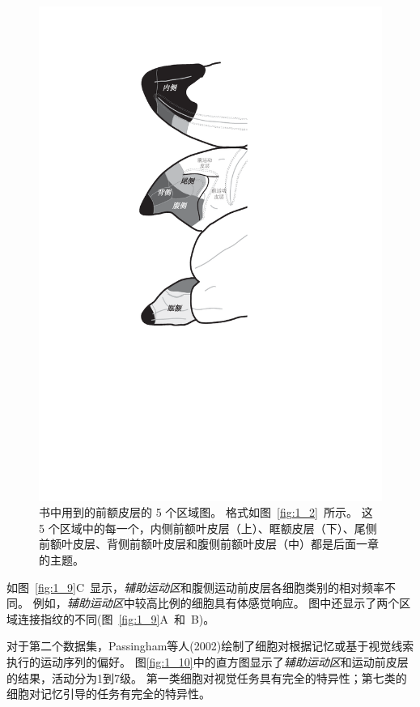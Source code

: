 \begin{figure}[!htb]
	\centering
	\includegraphics[width=0.35\linewidth]{chap1/1_8}
	\caption{书中用到的前额皮层的 5 个区域图。
		格式如图~\ref{fig:1_2}~所示。
		这 5 个区域中的每一个，内侧前额叶皮层（上）、眶额皮层（下）、尾侧前额叶皮层、背侧前额叶皮层和腹侧前额叶皮层（中）都是后面一章的主题。\label{fig:1_8}}
\end{figure}

\par
如图~\ref{fig:1_9}C~显示，\textit{辅助运动区}和腹侧运动前皮层各细胞类别的相对频率不同。
例如，\textit{辅助运动区}中较高比例的细胞具有体感觉响应。
图中还显示了两个区域连接指纹的不同(图~\ref{fig:1_9}A~和~B)。
\par
对于第二个数据集，Passingham等人(2002)绘制了细胞对根据记忆或基于视觉线索执行的运动序列的偏好\cite{2002Dorsal,mushiake1991neuronal}。
图\ref{fig:1_10}中的直方图显示了\textit{辅助运动区}和运动前皮层的结果，活动分为1到7级。
第一类细胞对视觉任务具有完全的特异性；第七类的细胞对记忆引导的任务有完全的特异性。


